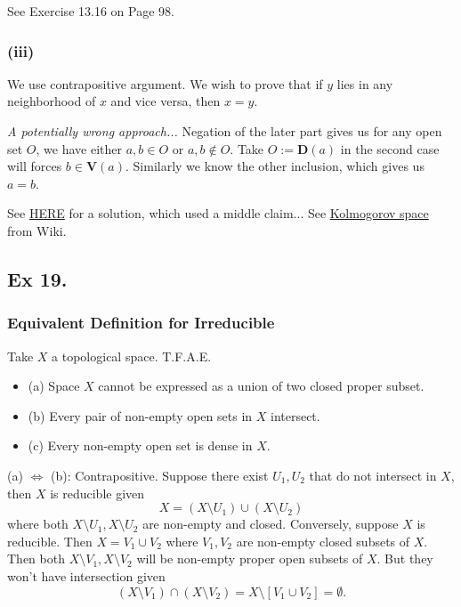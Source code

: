 See Exercise 13.16 \cite{altman} on Page 98. 

\subsubsection{(iii)} 

We use contrapositive argument. We wish to prove that if $y$ lies in any neighborhood of $x$ and vice versa, then $x=y$.  

\textit{A potentially wrong approach...}
Negation of the later part gives us for any open set $O$, we have either $a,b\in O$ or $a,b\notin O$. Take $O:=\mathbf D(a)$ in the second case will forces $b\in\mathbf V(a)$. Similarly we know the other inclusion, which gives us $a=b$. 

See \href{https://math.stackexchange.com/questions/108503/operatornamespec-a-as-a-topological-space-satisfying-the-t-0-axiom}{HERE}  for a solution, which used a middle claim...
See \href{https://en.wikipedia.org/wiki/Kolmogorov_space}{Kolmogorov space} from Wiki.



\subsection{Ex 19.}\label{Atiyah Chapter 1 Ex 19.}

\subsubsection{Equivalent Definition for Irreducible}

Take $X$ a topological space. T.F.A.E. 
\begin{itemize}
    \item (a) Space $X$ cannot be expressed as a union of two closed proper subset.
    \item (b) Every pair of non-empty open sets in $X$ intersect.
    \item (c) Every non-empty open set is dense in $X$.
\end{itemize}

(a) $\Leftrightarrow$ (b): Contrapositive. Suppose there exist $U_1,U_2$ that do not intersect in $X$, then $X$ is reducible given $$X=(X\setminus U_1)\cup(X\setminus U_2)$$ where both $X\setminus U_1,X\setminus U_2$ are non-empty and closed. 
Conversely, suppose $X$ is reducible. Then $X=V_1\cup V_2$ where $V_1,V_2$ are non-empty closed subsets of $X$. Then both $X\setminus V_1,X\setminus V_2$ will be non-empty proper open subsets of $X$. But they won't have intersection given 
$$(X\setminus V_1)\cap(X\setminus V_2)=X\setminus [V_1\cup V_2]=\emptyset.$$

